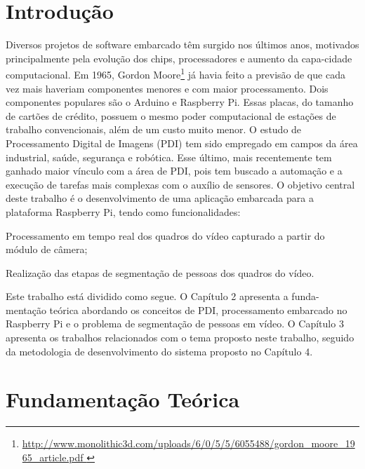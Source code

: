 \documentclass[12pt,oneside,a4paper,chapter=TITLE,section=TITLE,sumario=tradicional]{abntex2}
\begin{document}
\chapter{Introdução}
\label{cap:introducao}

Diversos projetos de software embarcado têm surgido nos últimos anos, motivados principalmente pela evolução dos chips, processadores e aumento da capa-cidade computacional. Em 1965, Gordon Moore\footnote{\url{ http://www.monolithic3d.com/uploads/6/0/5/5/6055488/gordon_moore_1965_article.pdf	
}}  já havia feito a previsão de que cada vez mais haveriam componentes menores e com maior processamento.
Dois componentes populares são o Arduino e Raspberry Pi.  Essas placas, do tamanho de cartões de crédito, possuem o mesmo poder computacional de estações de trabalho convencionais, além de um custo muito menor.   O estudo de Processamento Digital de Imagens (PDI) tem sido empregado em campos da área industrial, saúde, segurança e robótica. Esse último, mais recentemente tem ganhado maior vínculo com a área de PDI, pois tem buscado a automação e a execução de tarefas mais complexas com o auxílio de sensores.
O objetivo central deste trabalho é o desenvolvimento de uma aplicação embarcada para a plataforma Raspberry Pi, tendo como funcionalidades:  

\begin{lista}
    \item Processamento em tempo real dos quadros do vídeo capturado a partir do módulo de câmera;
    \item Realização das etapas de segmentação de pessoas dos quadros do vídeo.
\end{lista}

Este trabalho está dividido como segue. O Capítulo 2 apresenta a funda-mentação teórica abordando os conceitos de PDI, processamento embarcado no Raspberry Pi e o problema de segmentação de pessoas em vídeo. O Capítulo 3 apresenta os trabalhos relacionados com o tema proposto neste trabalho, seguido da metodologia de desenvolvimento do sistema proposto no Capítulo 4.


\chapter{Fundamentação Teórica}
\label{cap:fundamentacao-teorica}
\end{document}
